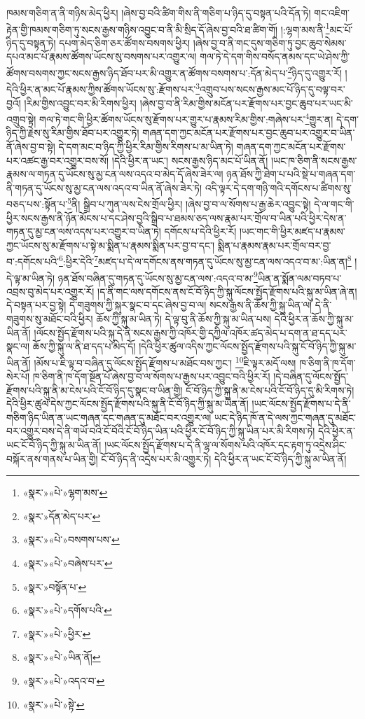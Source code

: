 ཁམས་གཅིག་ན་ནི་གཉིས་མེད་ཕྱིར། །ཞེས་བྱ་བའི་ཚིག་གིས་ནི་གཅིག་པ་ཉིད་དུ་བསྟན་པའི་དོན་ཏེ། གང་འཇིག་རྟེན་གྱི་ཁམས་གཅིག་ཏུ་སངས་རྒྱས་གཉིས་འབྱུང་བ་ནི་མི་སྲིད་དོ་ཞེས་བྱ་བའི་ཐ་ཚིག་གོ། །:ལྷག་མས་ནི་\footnote{«སྣར་»«པེ་»ལྷག་མས་}མང་པོ་ཉིད་དུ་བསྟན་ཏེ། དཔག་མེད་ཅིག་ཅར་ཚོགས་བསགས་ཕྱིར། །ཞེས་བྱ་བ་ནི་གང་དུས་གཅིག་ཏུ་བྱང་ཆུབ་སེམས་དཔའ་མང་པོ་རྣམས་ཚོགས་ཡོངས་སུ་བསགས་པར་འགྱུར་ལ། གལ་ཏེ་དེ་དག་གིས་བསོད་ནམས་དང་ཡེ་ཤེས་ཀྱི་ཚོགས་བསགས་ཀྱང་སངས་རྒྱས་ཉིད་ཐོབ་པར་མི་འགྱུར་ན་ཚོགས་བསགས་པ་:དོན་མེད་པ་\footnote{«སྣར་»དོན་མེད་པར་}ཉིད་དུ་འགྱུར་རོ། །དེའི་ཕྱིར་ན་མང་པོ་རྣམས་ཀྱིས་ཚོགས་ཡོངས་སུ་:རྫོགས་པར་\footnote{«སྣར་»«པེ་»བསགས་པས་}འགྲུབ་པས་སངས་རྒྱས་མང་པོ་ཉིད་དུ་བལྟ་བར་བྱའོ། །རིམ་གྱིས་འབྱུང་བར་མི་རིགས་ཕྱིར། །ཞེས་བྱ་བ་ནི་རིམ་གྱིས་མངོན་པར་རྫོགས་པར་བྱང་ཆུབ་པར་ཡང་མི་འགྲུབ་སྟེ། གལ་ཏེ་གང་གི་ཕྱིར་ཚོགས་ཡོངས་སུ་རྫོགས་པར་གྱུར་པ་རྣམས་རིམ་གྱིས་:གཞེས་པར་\footnote{«སྣར་»«པེ་»བཞེས་པར་}གྱུར་ན། དེ་དག་ཉིད་ཀྱི་རྗེས་སུ་རིམ་གྱིས་ཐོབ་པར་འགྱུར་ཏེ། གཞན་དག་ཀྱང་མངོན་པར་རྫོགས་པར་བྱང་ཆུབ་པར་འགྱུར་བ་ཡིན་ནོ་ཞེས་བྱ་བ་སྟེ། དེ་དག་མང་བ་ཉིད་ཀྱི་ཕྱིར་རིམ་གྱིས་རིགས་པ་མ་ཡིན་ཏེ། གཞན་དག་ཀྱང་མངོན་པར་རྫོགས་པར་འཚང་རྒྱ་བར་འགྱུར་བས་སོ། །དེའི་ཕྱིར་ན་ཡང་། སངས་རྒྱས་ཉིད་མང་པོ་ཡིན་ནོ། །ཡང་ཁ་ཅིག་ནི་སངས་རྒྱས་རྣམས་ལ་གཏན་དུ་ཡོངས་སུ་མྱ་ངན་ལས་འདའ་བ་མེད་དོ་ཞེས་ཟེར་ལ། ཉན་ཐོས་ཀྱི་ཐེག་པ་པའི་སྡེ་པ་གཞན་དག་ནི་གཏན་དུ་ཡོངས་སུ་མྱ་ངན་ལས་འདའ་བ་ཡིན་ནོ་ཞེས་ཟེར་ཏེ། འདི་ལྟར་དེ་དག་གཉི་གའི་དགོངས་པ་ཚིགས་སུ་བཅད་པས་:སྟོན་པ་\footnote{«སྣར་»བསྟོན་པ་}ནི། སྒྲིབ་པ་ཀུན་ལས་ངེས་གྲོལ་ཕྱིར། །ཞེས་བྱ་བ་ལ་སོགས་པ་རྒྱ་ཆེར་འབྱུང་སྟེ། དེ་ལ་གང་གི་ཕྱིར་སངས་རྒྱས་ནི་ཉོན་མོངས་པ་དང་ཤེས་བྱའི་སྒྲིབ་པ་ཐམས་ཅད་ལས་རྣམ་པར་གྲོལ་བ་ཡིན་པའི་ཕྱིར་དེས་ན་གཏན་དུ་མྱ་ངན་ལས་འདས་པར་འགྱུར་བ་ཡིན་ཏེ། དགོངས་པ་དེའི་ཕྱིར་རོ། །ཡང་གང་གི་ཕྱིར་མཛད་པ་རྣམས་ཀྱང་ཡོངས་སུ་མ་རྫོགས་པ་སྟེ་མ་སྨིན་པ་རྣམས་སྨིན་པར་བྱ་བ་དང་། སྨིན་པ་རྣམས་རྣམ་པར་གྲོལ་བར་བྱ་བ་:དགོངས་པའི་\footnote{«སྣར་»«པེ་»དགོས་པའི་}:ཕྱིར་དེའི་\footnote{«སྣར་»«པེ་»ཕྱིར་}མཛད་པ་དེ་ལ་དགོངས་ནས་གཏན་དུ་ཡོངས་སུ་མྱ་ངན་ལས་འདའ་བ་མ་:ཡིན་ན།\footnote{«སྣར་»«པེ་»ཡིན་ནོ།} །དེ་ལྟ་མ་ཡིན་ཏེ། ཉན་ཐོས་བཞིན་དུ་གཏན་དུ་ཡོངས་སུ་མྱ་ངན་ལས་:འདའ་བ་མ་\footnote{«སྣར་»«པེ་»འདའ་བ་}ཡིན་ན་སྨོན་ལམ་བཏབ་པ་འབྲས་བུ་མེད་པར་འགྱུར་རོ། །ད་ནི་གང་ལས་དགོངས་ནས་ངོ་བོ་ཉིད་ཀྱི་སྐུ་ལོངས་སྤྱོད་རྫོགས་པའི་སྐུ་མ་ཡིན་ཞེ་ན། དེ་བསྟན་པར་བྱ་སྟེ། དེ་གཟུགས་ཀྱི་སྐུར་སྣང་བ་དང་ཞེས་བྱ་བ་ལ། སངས་རྒྱས་ནི་ཆོས་ཀྱི་སྐུ་ཡིན་ལ། དེ་ནི་གཟུགས་སུ་མཐོང་བའི་ཕྱིར། ཆོས་ཀྱི་སྐུ་མ་ཡིན་ཏེ། དེ་ལྟ་བུ་ནི་ཆོས་ཀྱི་སྐུ་མ་ཡིན་པས། དེའི་ཕྱིར་ན་ཆོས་ཀྱི་སྐུ་མ་ཡིན་ནོ། །ལོངས་སྤྱོད་རྫོགས་པའི་སྐུ་དེ་ནི་སངས་རྒྱས་ཀྱི་འཁོར་གྱི་དཀྱིལ་འཁོར་ཚད་མེད་པ་དག་ན་ཐ་དད་པར་སྣང་ལ། ཆོས་ཀྱི་སྐུ་ལ་ནི་ཐ་དད་པ་མེད་དོ། །དེའི་ཕྱིར་ཚུལ་འདིས་ཀྱང་ལོངས་སྤྱོད་རྫོགས་པའི་སྐུ་ངོ་བོ་ཉིད་ཀྱི་སྐུ་མ་ཡིན་ནོ། །མོས་པ་ཇི་ལྟ་བ་བཞིན་དུ་ལོངས་སྤྱོད་རྫོགས་པ་མཐོང་བས་ཀྱང་། \footnote{«སྣར་»«པེ་»སྟེ་}ཇི་ལྟར་མདོ་ལས། ཁ་ཅིག་ནི་ཁ་དོག་སེར་པོ། ཁ་ཅིག་ནི་ཁ་དོག་སྔོན་པོ་ཞེས་བྱ་བ་ལ་སོགས་པ་རྒྱས་པར་འབྱུང་བའི་ཕྱིར་རོ། །དེ་བཞིན་དུ་ལོངས་སྤྱོད་རྫོགས་པའི་སྐུ་ནི་མ་ངེས་པའི་ངོ་བོ་ཉིད་དུ་སྣང་བ་ཡིན་གྱི། ངོ་བོ་ཉིད་ཀྱི་སྐུ་ནི་མ་ངེས་པའི་ངོ་བོ་ཉིད་དུ་མི་རིགས་ཏེ། དེའི་ཕྱིར་ཚུལ་དེས་ཀྱང་ལོངས་སྤྱོད་རྫོགས་པའི་སྐུ་ནི་ངོ་བོ་ཉིད་ཀྱི་སྐུ་མ་ཡིན་ནོ། །ཡང་ལོངས་སྤྱོད་རྫོགས་པ་དེ་ནི་གཅིག་ཉིད་ཡིན་ན་ཡང་གཞན་དང་གཞན་དུ་མཐོང་བར་འགྱུར་ལ། ཡང་དེ་ཉིད་ཁོ་ན་དེ་ལས་ཀྱང་གཞན་དུ་མཐོང་བར་འགྱུར་བས་དེ་ནི་གཡོ་བའི་ངོ་བོའི་ངོ་བོ་ཉིད་ཡིན་པའི་ཕྱིར་ངོ་བོ་ཉིད་ཀྱི་སྐུ་ཡིན་པར་མི་རིགས་ཏེ། དེའི་ཕྱིར་ན་ཡང་ངོ་བོ་ཉིད་ཀྱི་སྐུ་མ་ཡིན་ནོ། །ཡང་ལོངས་སྤྱོད་རྫོགས་པ་དེ་ནི་ལྷ་ལ་སོགས་པའི་འཁོར་དང་རྟག་ཏུ་འདྲེས་ཤིང་བསྐོར་ནས་གནས་པ་ཡིན་གྱི། ངོ་བོ་ཉིད་ནི་འདྲེས་པར་མི་འགྱུར་ཏེ། དེའི་ཕྱིར་ན་ཡང་ངོ་བོ་ཉིད་ཀྱི་སྐུ་མ་ཡིན་ནོ། 
